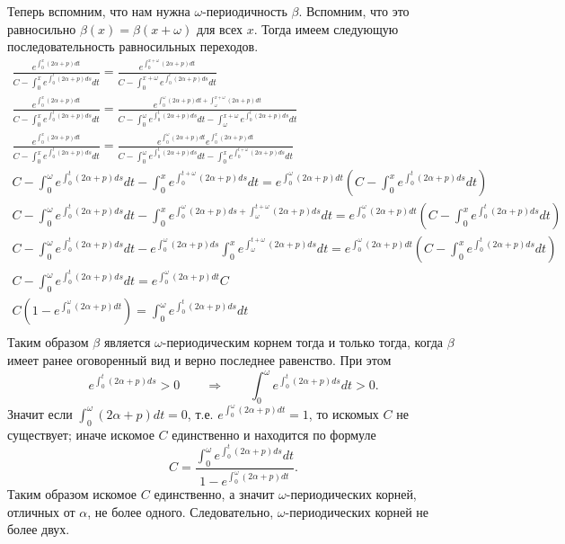 \documentclass[12pt,a4paper]{article}
\begin{document}
\begin{problem}{3}
        Теперь вспомним, что нам нужна $\omega$-периодичность $\beta$. Вспомним, что это равносильно $\beta(x) = \beta(x + \omega)$ для всех $x$. Тогда имеем следующую последовательность равносильных переходов.
        \begin{gather*}
            \frac{e^{\int_0^x (2\alpha + p)dt}}{C - \int_0^x e^{\int_0^t (2\alpha + p)ds} dt}
            = \frac{e^{\int_0^{x + \omega} (2\alpha + p)dt}}{C - \int_0^{x + \omega} e^{\int_0^t (2\alpha + p)ds} dt}\\
            \frac{e^{\int_0^x (2\alpha + p)dt}}{C - \int_0^x e^{\int_0^t (2\alpha + p)ds} dt}
            = \frac{e^{\int_0^\omega (2\alpha + p)dt + \int_\omega^{x + \omega} (2\alpha + p)dt}}{C - \int_0^\omega e^{\int_0^t (2\alpha + p)ds} dt - \int_\omega^{x + \omega} e^{\int_0^t (2\alpha + p)ds} dt}\\
            \frac{e^{\int_0^x (2\alpha + p)dt}}{C - \int_0^x e^{\int_0^t (2\alpha + p)ds} dt}
            = \frac{e^{\int_0^\omega (2\alpha + p)dt} e^{\int_0^x (2\alpha + p)dt}}{C - \int_0^\omega e^{\int_0^t (2\alpha + p)ds} dt - \int_0^x e^{\int_0^{t + \omega} (2\alpha + p)ds} dt}\\
            C - \int_0^\omega e^{\int_0^t (2\alpha + p)ds} dt - \int_0^x e^{\int_0^{t + \omega} (2\alpha + p)ds} dt
            = e^{\int_0^\omega (2\alpha + p)dt} \left(C - \int_0^x e^{\int_0^t (2\alpha + p)ds} dt\right)\\
            C - \int_0^\omega e^{\int_0^t (2\alpha + p)ds} dt - \int_0^x e^{\int_0^\omega (2\alpha + p)ds + \int_\omega^{t + \omega} (2\alpha + p)ds} dt
            = e^{\int_0^\omega (2\alpha + p)dt} \left(C - \int_0^x e^{\int_0^t (2\alpha + p)ds} dt\right)\\
            C - \int_0^\omega e^{\int_0^t (2\alpha + p)ds} dt - e^{\int_0^\omega (2\alpha + p)ds} \int_0^x e^{\int_\omega^{t + \omega} (2\alpha + p)ds} dt
            = e^{\int_0^\omega (2\alpha + p)dt} \left(C - \int_0^x e^{\int_0^t (2\alpha + p)ds} dt\right)\\
            C - \int_0^\omega e^{\int_0^t (2\alpha + p)ds} dt = e^{\int_0^\omega (2\alpha + p)dt} C\\
            C \left(1 - e^{\int_0^\omega (2\alpha + p)dt}\right) = \int_0^\omega e^{\int_0^t (2\alpha + p)ds} dt\\
        \end{gather*}
        Таким образом $\beta$ является $\omega$-периодическим корнем тогда и только тогда, когда $\beta$ имеет ранее оговоренный вид и верно последнее равенство. При этом
        \[e^{\int_0^t (2\alpha + p)ds} > 0 \qquad \Longrightarrow \qquad \int_0^\omega e^{\int_0^t (2\alpha + p)ds} dt > 0.\]
        Значит если $\int_0^\omega (2\alpha + p)dt = 0$, т.е. $e^{\int_0^\omega (2\alpha + p)dt} = 1$, то искомых $C$ не существует; иначе искомое $C$ единственно и находится по формуле
        \[C = \frac{\int_0^\omega e^{\int_0^t (2\alpha + p)ds} dt}{1 - e^{\int_0^\omega (2\alpha + p)dt}}.\]
        Таким образом искомое $C$ единственно, а значит $\omega$-периодических корней, отличных от $\alpha$, не более одного. Следовательно, $\omega$-периодических корней не более двух.
    \end{problem}
\end{document}
